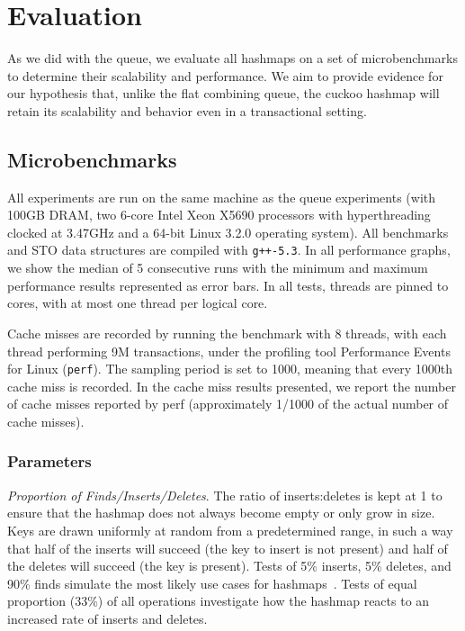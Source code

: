 \section{Evaluation}
\label{hm_eval}

As we did with the queue, we evaluate all hashmaps on a set of microbenchmarks to determine their scalability and performance. We aim to provide evidence for our hypothesis that, unlike the flat combining queue, the cuckoo hashmap will retain its scalability and behavior even in a transactional setting.

\subsection{Microbenchmarks}
All experiments are run on the same machine as the queue experiments (with 100GB DRAM, two 6-core Intel Xeon X5690 processors with hyperthreading clocked at 3.47GHz and a 64-bit Linux 3.2.0 operating system). All benchmarks and STO data structures are compiled with \texttt{g++-5.3}. In all performance graphs, we show the median of 5 consecutive runs with the minimum and maximum performance results represented as error bars.
In all tests, threads are pinned to cores, with at most one thread per logical core.

Cache misses are recorded by running the benchmark with 8 threads, with each thread performing 9M transactions, under the profiling tool Performance Events for Linux (\texttt{perf}). The sampling period is set to 1000, meaning that every 1000th cache miss is recorded.
In the cache miss results presented, we report the number of cache misses reported by perf (approximately 1/1000 of the actual number of cache misses).

\subsubsection{Parameters}

    \emph{Proportion of Finds/Inserts/Deletes}. The ratio of inserts:deletes is kept at 1 to ensure that the hashmap does not always become empty or only grow in size. Keys are drawn uniformly at random from a predetermined range, in such a way that half of the inserts will succeed (the key to insert is not present) and half of the deletes will succeed (the key is present). Tests of 5\% inserts, 5\% deletes, and 90\% finds simulate the most likely use cases for hashmaps~\cite{hm1}. Tests of equal proportion (33\%) of all operations investigate how the hashmap reacts to an increased rate of inserts and deletes.

